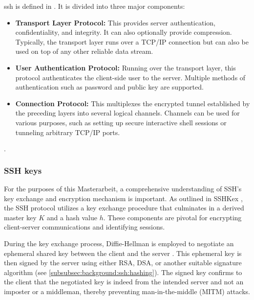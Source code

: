     \acrshort{ssh} is defined in  \cite{RFC4251}. It is divided into three major components:

    \begin{itemize}
        \item \textbf{Transport Layer Protocol:} This provides server authentication, confidentiality, and integrity. It can also optionally provide compression. Typically, the transport layer runs over a TCP/IP connection but can also be used on top of any other reliable data stream.
        \item \textbf{User Authentication Protocol:} Running over the transport layer, this protocol authenticates the client-side user to the server. Multiple methods of authentication such as password and public key are supported.
        \item \textbf{Connection Protocol:} This multiplexes the encrypted tunnel established by the preceding layers into several logical channels. Channels can be used for various purposes, such as setting up secure interactive shell sessions or tunneling arbitrary TCP/IP ports.
    \end{itemize}

     \cite{RFC4251}.

    \subsubsection{SSH keys}\label{sec:background:ssh:ssh_keys}
    For the purposes of this Masterarbeit, a comprehensive understanding of SSH's key exchange and encryption mechanism is important. As outlined in SSHKex \cite{SSHkex22}, the SSH protocol utilizes a key exchange procedure that culminates in a derived master key \( K \) and a hash value \( h \). These components are pivotal for encrypting client-server communications and identifying sessions.

    During the key exchange process, Diffie-Hellman is employed to negotiate an ephemeral shared key between the client and the server \cite{RFC4251} \cite{StackExchangeSSHuseRASandDH23}. This ephemeral key is then signed by the server using either RSA, DSA, or another suitable signature algorithm (see \ref{subsubsec:background:ssh:hashing}). The signed key confirms to the client that the negotiated key is indeed from the intended server and not an imposter or a middleman, thereby preventing man-in-the-middle (MITM) attacks.

